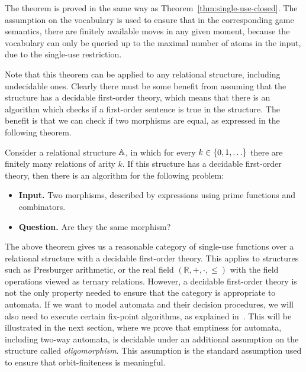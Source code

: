 The theorem is proved in the same way as Theorem~\ref{thm:single-use-closed}.  The assumption on the vocabulary is used to ensure that in the corresponding game semantics, there are finitely available moves in any given moment, because the vocabulary can only be queried up to the maximal number of atoms in the input, due to the single-use restriction.

Note that this  theorem can be applied to any relational structure, including undecidable ones. Clearly there must be some benefit from assuming that the structure has a decidable first-order theory, which means that there is an algorithm which checks if a first-order sentence is true in the structure. 
The benefit is that we can check if two morphisms are equal, as expressed in the following theorem. 

\begin{theorem}\label{thm:first-order-decidable}
    Consider a relational structure $\mathbb A$, in which for every $k \in \{0,1,\ldots\}$ there are finitely many relations of arity $k$. If this structure has a decidable first-order theory, then there is an algorithm for the following problem:
    \begin{itemize}
        \item {\bf Input.} Two morphisms, described by expressions using prime functions and combinators.
        \item {\bf Question.} Are they the same morphism?
    \end{itemize}
\end{theorem}




The above theorem gives us a reasonable category of single-use functions over a relational structure with a decidable first-order theory. This applies to structures such as Presburger arithmetic, or the real field $(\mathbb R, +, \cdot, \leq)$ with the field operations viewed as ternary relations. 
However, a decidable first-order theory is not the only property needed to ensure that the category is appropriate to automata. If we want to model automata and their decision procedures, we will also need to execute certain fix-point algorithms, as explained in~\cite{bojanczyk_slightly2018}. This will be illustrated in the next section, where we prove that emptiness for automata, including two-way automata, is decidable under an additional assumption on the structure called \emph{oligomorphism}. This assumption is the standard assumption used to ensure that orbit-finiteness is meaningful. 


